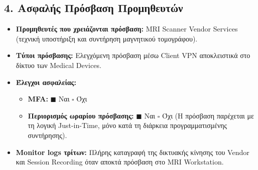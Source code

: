 \documentclass[11pt,a4paper]{article}
\begin{document}
\subsection*{4. Ασφαλής Πρόσβαση Προμηθευτών}
\begin{itemize}
    \item \textbf{Προμηθευτές που χρειάζονται πρόσβαση:} MRI Scanner Vendor Services (τεχνική υποστήριξη και συντήρηση μαγνητικού τομογράφου).
    \item \textbf{Τύποι πρόσβασης:} Ελεγχόμενη πρόσβαση μέσω Client VPN αποκλειστικά στο δίκτυο των Medical Devices.
    \item \textbf{Έλεγχοι ασφαλείας:}
    \begin{itemize}
        \item \textbf{MFA:} $\blacksquare$ Ναι \quad $\square$ Όχι
        \item \textbf{Περιορισμός ωραρίου πρόσβασης:} $\blacksquare$ Ναι \quad $\square$ Όχι (Η πρόσβαση παρέχεται με τη λογική Just-in-Time, μόνο κατά τη διάρκεια προγραμματισμένης συντήρησης).
    \end{itemize}
    \item \textbf{Monitor logs τρίτων:} Πλήρης καταγραφή της δικτυακής κίνησης του Vendor και Session Recording όταν αποκτά πρόσβαση στο MRI Workstation.
\end{itemize}
\end{document}
